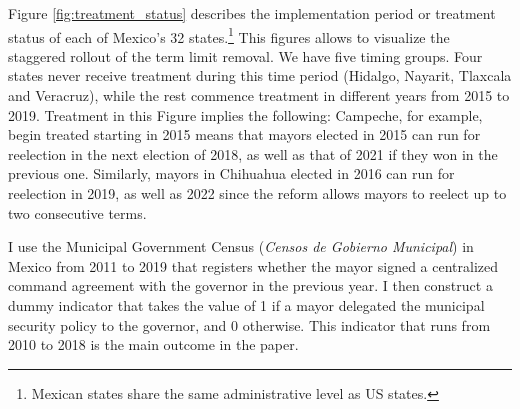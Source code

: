 \documentclass[12pt]{amsart}
\makeatletter
\def\section{\@startsection{section}{1}
	\z@{1.0\linespacing\@plus\linespacing}{.5\linespacing}{\Large}}
\numberwithin{equation}{section}
\theoremstyle{definition}
\theoremstyle{definition}
\theoremstyle{definition}
\makeatother
\begin{document}
Figure \ref{fig:treatment_status} describes the implementation period or treatment status of each of Mexico's 32 states.\footnote{Mexican states share the same administrative level as US states.} This figures allows to visualize the staggered rollout of the term limit removal. We have five timing groups. Four states never receive treatment during this time period (Hidalgo, Nayarit, Tlaxcala and Veracruz), while the rest commence treatment in different years from 2015 to 2019. %
Treatment in this Figure implies the following: Campeche, for example, begin treated starting in 2015 means that mayors elected in 2015 can run for reelection in the next election of 2018, as well as that of 2021 if they won in the previous one. Similarly, mayors in Chihuahua elected in 2016 can run for reelection in 2019, as well as 2022 since the reform allows mayors to reelect up to two consecutive terms.  

\section{Data \label{sec:data}}  

I use the Municipal Government Census (\emph{Censos de Gobierno Municipal}) in Mexico from 2011 to 2019 that registers whether the mayor signed a centralized command agreement with the governor in the previous year. I then construct a dummy indicator that takes the value of 1 if a mayor delegated the municipal security policy to the governor, and 0 otherwise. This indicator that runs from 2010 to 2018 is the main outcome in the paper. 
\end{document}
